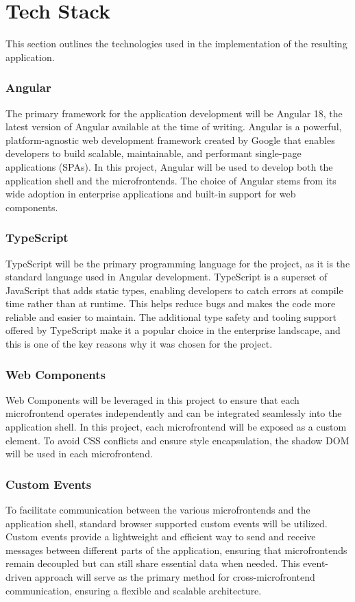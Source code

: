 \section{Tech Stack}
This section outlines the technologies used in the implementation of the resulting application.

\subsubsection*{Angular}
The primary framework for the application development will be Angular 18, the latest version of Angular available at the time of writing. Angular is a powerful, platform-agnostic web development framework created by Google that enables developers to build scalable, maintainable, and performant single-page applications (SPAs). In this project, Angular will be used to develop both the application shell and the microfrontends. The choice of Angular stems from its wide adoption in enterprise applications and built-in support for web components.

\subsubsection*{TypeScript}
TypeScript will be the primary programming language for the project, as it is the standard language used in Angular development. TypeScript is a superset of JavaScript that adds static types, enabling developers to catch errors at compile time rather than at runtime. This helps reduce bugs and makes the code more reliable and easier to maintain. The additional type safety and tooling support offered by TypeScript make it a popular choice in the enterprise landscape, and this is one of the key reasons why it was chosen for the project.

\subsubsection*{Web Components}
Web Components will be leveraged in this project to ensure that each microfrontend operates independently and can be integrated seamlessly into the application shell. In this project, each microfrontend will be exposed as a custom element. To avoid CSS conflicts and ensure style encapsulation, the shadow DOM will be used in each microfrontend. 

\subsubsection*{Custom Events}
To facilitate communication between the various microfrontends and the application shell, standard browser supported custom events will be utilized. Custom events provide a lightweight and efficient way to send and receive messages between different parts of the application, ensuring that microfrontends remain decoupled but can still share essential data when needed. This event-driven approach will serve as the primary method for cross-microfrontend communication, ensuring a flexible and scalable architecture.


